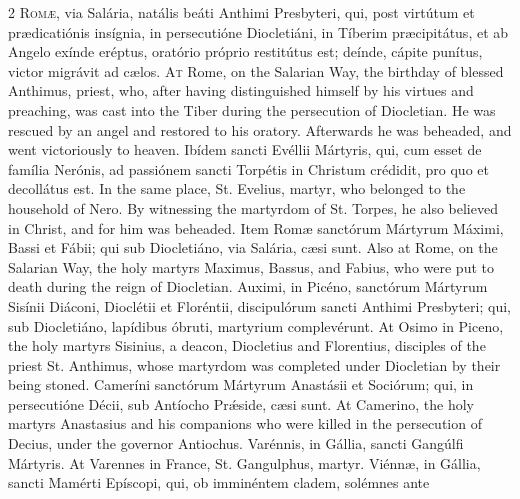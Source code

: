 \begin{paracol}{2}
\lettrine[lines=2]{R}{omæ,} via Salária, 
 natális beáti Anthimi Presbyteri, qui, post virtútum et prædicatiónis 
 insígnia, in persecutióne Diocletiáni, in Tíberim præcipitátus, et ab Angelo 
 exínde eréptus, oratório próprio restitútus est; deínde, cápite punítus, 
 victor migrávit ad cælos.
\switchcolumn
{}
\lettrine[lines=2]{A}{t} Rome, on the Salarian Way, the 
 birthday of blessed Anthimus, priest, who, after having distinguished 
 himself by his virtues and preaching, was cast into the Tiber during the 
 persecution of Diocletian. He was rescued by an angel and restored to 
 his oratory. Afterwards he was beheaded, and went victoriously to 
 heaven.
\switchcolumn*
{}
Ibídem sancti Evéllii 
 Mártyris, qui, cum esset de família Nerónis, ad passiónem sancti Torpétis in 
 Christum crédidit, pro quo et decollátus est.
\switchcolumn
{}
In the same place, St. Evelius, 
 martyr, who belonged to the household of Nero. By witnessing the 
 martyrdom of St. Torpes, he also believed in Christ, and for him was 
 beheaded.
\switchcolumn*
{}
Item Romæ sanctórum 
 Mártyrum Máximi, Bassi et Fábii; qui sub Diocletiáno, via Salária, cæsi sunt.
\switchcolumn
{}
Also at Rome, on the Salarian Way, 
 the holy martyrs Maximus, Bassus, and Fabius, who were put to death during 
 the reign of Diocletian.
\switchcolumn*
{}
Auximi, in Picéno, 
 sanctórum Mártyrum Sisínii Diáconi, Dioclétii et Floréntii, discipulórum 
 sancti Anthimi Presbyteri; qui, sub Diocletiáno, lapídibus óbruti, martyrium 
 complevérunt.
\switchcolumn
{}
At Osimo in Piceno, the holy 
 martyrs Sisinius, a deacon, Diocletius and Florentius, disciples of the 
 priest St. Anthimus, whose martyrdom was completed under Diocletian by their 
 being stoned.
\switchcolumn*
{}
Cameríni sanctórum 
 Mártyrum Anastásii et Sociórum; qui, in persecutióne Décii, sub Antíocho Prǽside, cæsi sunt.
\switchcolumn
{}
At Camerino, the holy martyrs 
 Anastasius and his companions who were killed in the persecution of Decius, 
 under the governor Antiochus.
\switchcolumn*
{}
Varénnis, in Gállia, 
 sancti Gangúlfi Mártyris.
\switchcolumn
{}
At Varennes in France, St. 
 Gangulphus, martyr.
\switchcolumn*
{}
Viénnæ, in Gállia, 
 sancti Mamérti Epíscopi, qui, ob imminéntem cladem, solémnes ante 

\end{paracol}
